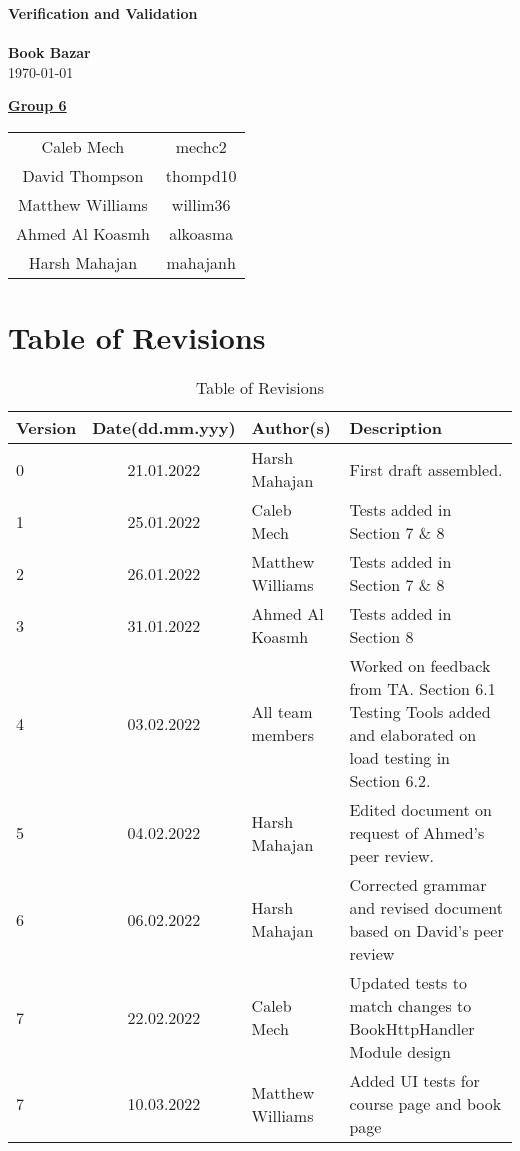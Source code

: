 \documentclass[fullpage]{article}
\begin{document}
\vspace*{\fill}
\begin{center}

  {\Huge \textbf{Verification and Validation}}\\
\hrulefill\\[2mm]
  {\huge \textbf{Book Bazar}}\\[2mm]
{\large \today}\\[15mm]
{\large
\underline{\textbf{Group 6}}\\
\begin{tabular}{ c c }

 Caleb Mech & mechc2\\ 
 David Thompson & thompd10\\
 Matthew Williams & willim36\\
 Ahmed Al Koasmh & alkoasma\\
 Harsh Mahajan	& mahajanh    
\end{tabular}
}

\end{center}

\vspace*{\fill}

\newpage
\begingroup
\hypersetup{hidelinks}
\tableofcontents

\listoffigures
\listoftables
\endgroup
\newpage

\section{Table of Revisions}
\begin{table}[h]
\centering
\begin{tabular}{| l | c | p{4cm}| p{5cm}|}
\hline
 \rowcolor{lightgray} 
\textbf{Version} & \textbf{Date(dd.mm.yyy)} &\textbf{Author(s)} &\textbf{Description}\\
\hline
0 & 21.01.2022 & Harsh Mahajan & First draft assembled.\\
\hline
1 & 25.01.2022 & Caleb Mech & Tests added in Section 7 \& 8\\
\hline
2 & 26.01.2022 & Matthew Williams & Tests added in Section 7 \& 8\\
\hline
3 & 31.01.2022 & Ahmed Al Koasmh & Tests added in Section 8\\
\hline
4& 03.02.2022& All team members & Worked on feedback from TA. Section 6.1 Testing Tools added and elaborated on load testing in Section 6.2.\\
\hline
5& 04.02.2022& Harsh Mahajan & Edited document on request of Ahmed's peer review.\\
\hline
6& 06.02.2022& Harsh Mahajan& Corrected grammar and revised document based on David's peer review\\
\hline
7& 22.02.2022& Caleb Mech & Updated tests to match changes to BookHttpHandler Module design\\
\hline
7& 10.03.2022& Matthew Williams & Added UI tests for course page and book page\\
\hline
\end{tabular}
\caption{Table of Revisions}

\end{table}
\end{document}
